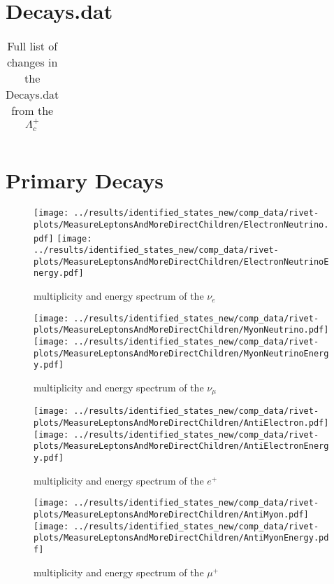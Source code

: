 \section{Decays.dat}
\begin{longtable}{| c | c | c | c |}
  \caption{Full list of changes in the Decays.dat from the \(\Lambda_c^+\)}\label{ta:changes-full}\\ 
  \hline
  
\end{longtable}

\newpage
\section{Primary Decays} \label{a:primary}
\begin{figure}[h]
  \centering
  \texttt{[image: ../results/identified\_states\_new/comp\_data/rivet-plots/MeasureLeptonsAndMoreDirectChildren/ElectronNeutrino.pdf]}
  \texttt{[image: ../results/identified\_states\_new/comp\_data/rivet-plots/MeasureLeptonsAndMoreDirectChildren/ElectronNeutrinoEnergy.pdf]}
  \caption{multiplicity and energy spectrum of the \(\nu_e\)}
\end{figure}
\begin{figure}[h]
  \centering
  \texttt{[image: ../results/identified\_states\_new/comp\_data/rivet-plots/MeasureLeptonsAndMoreDirectChildren/MyonNeutrino.pdf]}
  \texttt{[image: ../results/identified\_states\_new/comp\_data/rivet-plots/MeasureLeptonsAndMoreDirectChildren/MyonNeutrinoEnergy.pdf]}
  \caption{multiplicity and energy spectrum of the \(\nu_\mu\)}
\end{figure}

\begin{figure}[h]
  \centering
  \texttt{[image: ../results/identified\_states\_new/comp\_data/rivet-plots/MeasureLeptonsAndMoreDirectChildren/AntiElectron.pdf]}
  \texttt{[image: ../results/identified\_states\_new/comp\_data/rivet-plots/MeasureLeptonsAndMoreDirectChildren/AntiElectronEnergy.pdf]}
  \caption{multiplicity and energy spectrum of the \(e^+\)}
\end{figure}
\begin{figure}[h]
  \centering
  \texttt{[image: ../results/identified\_states\_new/comp\_data/rivet-plots/MeasureLeptonsAndMoreDirectChildren/AntiMyon.pdf]}
  \texttt{[image: ../results/identified\_states\_new/comp\_data/rivet-plots/MeasureLeptonsAndMoreDirectChildren/AntiMyonEnergy.pdf]}
  \caption{multiplicity and energy spectrum of the \(\mu^+\)}
\end{figure}

